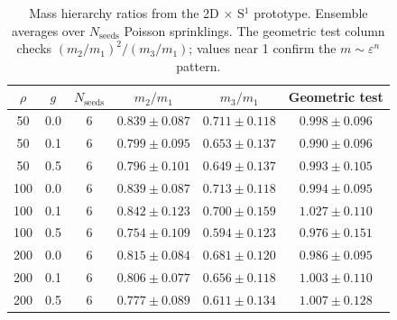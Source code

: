 \begin{table}[h]
\centering
\caption{Mass hierarchy ratios from the 2D $\times$ S$^1$ prototype. Ensemble averages over $N_\mathrm{seeds}$ Poisson sprinklings. The geometric test column checks $(m_2/m_1)^2 / (m_3/m_1)$; values near 1 confirm the $m \sim \varepsilon^n$ pattern.}
\label{tab:scaling}
\begin{tabular}{cccccc}
\toprule
$\rho$ & $g$ & $N_\mathrm{seeds}$ & $m_2/m_1$ & $m_3/m_1$ & Geometric test \\
\midrule
  50 & 0.0 & 6 & $0.839 \pm 0.087$ & $0.711 \pm 0.118$ & $0.998 \pm 0.096$ \\
  50 & 0.1 & 6 & $0.799 \pm 0.095$ & $0.653 \pm 0.137$ & $0.990 \pm 0.096$ \\
  50 & 0.5 & 6 & $0.796 \pm 0.101$ & $0.649 \pm 0.137$ & $0.993 \pm 0.105$ \\
  100 & 0.0 & 6 & $0.839 \pm 0.087$ & $0.713 \pm 0.118$ & $0.994 \pm 0.095$ \\
  100 & 0.1 & 6 & $0.842 \pm 0.123$ & $0.700 \pm 0.159$ & $1.027 \pm 0.110$ \\
  100 & 0.5 & 6 & $0.754 \pm 0.109$ & $0.594 \pm 0.123$ & $0.976 \pm 0.151$ \\
  200 & 0.0 & 6 & $0.815 \pm 0.084$ & $0.681 \pm 0.120$ & $0.986 \pm 0.095$ \\
  200 & 0.1 & 6 & $0.806 \pm 0.077$ & $0.656 \pm 0.118$ & $1.003 \pm 0.110$ \\
  200 & 0.5 & 6 & $0.777 \pm 0.089$ & $0.611 \pm 0.134$ & $1.007 \pm 0.128$ \\
\bottomrule
\end{tabular}
\end{table}
